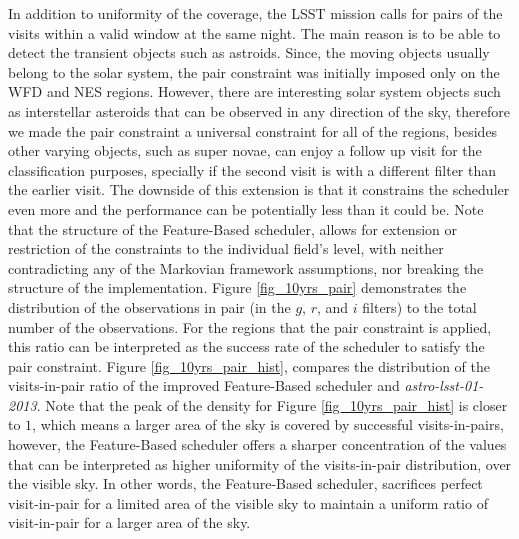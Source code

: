 \documentclass[12pt,aas_macros]{article}
\theoremstyle{definition}
\begin{document}
In addition to uniformity of the coverage, the LSST mission calls for pairs of the visits within a valid window at the same night. The main reason is to be able to detect the transient objects such as astroids. Since, the moving objects usually belong to the solar system, the pair constraint was initially imposed only on the WFD and NES regions. However, there are interesting solar system objects such as interstellar asteroids that can be observed in any direction of the sky, therefore we made the pair constraint a universal constraint for all of the regions, besides other varying objects, such as super novae, can enjoy a follow up visit for the classification purposes, specially if the second visit is with a different filter than the earlier visit. The downside of this extension is that it constrains the scheduler even more and the performance can be potentially less than it could be. Note that the structure of the Feature-Based scheduler, allows for extension or restriction of the constraints to the individual field's level, with neither contradicting any of the Markovian framework assumptions, nor breaking the structure of the implementation. Figure \ref{fig_10yrs_pair} demonstrates the distribution of the observations in pair (in the $g$, $r$, and $i$ filters) to the total number of the observations. For the regions that the pair constraint is applied, this ratio can be interpreted as the success rate of the scheduler to satisfy the pair constraint. Figure \ref{fig_10yrs_pair_hist}, compares the distribution of the visits-in-pair ratio of the improved Feature-Based scheduler and \textit{astro-lsst-01-2013}. Note that the peak of the density for Figure \ref{fig_10yrs_pair_hist} is closer to $1$, which means a larger area of the sky is covered by successful visits-in-pairs, however, the Feature-Based scheduler offers a sharper concentration of the values that can be interpreted as higher uniformity of the visits-in-pair distribution, over the visible sky. In other words, the Feature-Based scheduler, sacrifices perfect visit-in-pair for a limited area of the visible sky to maintain a uniform ratio of visit-in-pair for a larger area of the sky.
\end{document}
